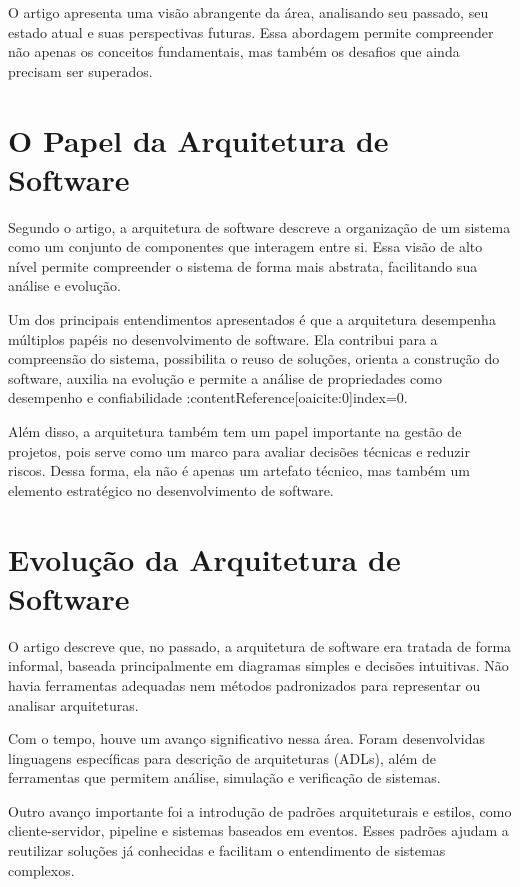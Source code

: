 \documentclass[conference]{IEEEtran}
\begin{document}
O artigo apresenta uma visão abrangente da área, analisando seu passado, seu estado atual e suas perspectivas futuras. Essa abordagem permite compreender não apenas os conceitos fundamentais, mas também os desafios que ainda precisam ser superados.

\section{O Papel da Arquitetura de Software}

Segundo o artigo, a arquitetura de software descreve a organização de um sistema como um conjunto de componentes que interagem entre si. Essa visão de alto nível permite compreender o sistema de forma mais abstrata, facilitando sua análise e evolução.

Um dos principais entendimentos apresentados é que a arquitetura desempenha múltiplos papéis no desenvolvimento de software. Ela contribui para a compreensão do sistema, possibilita o reuso de soluções, orienta a construção do software, auxilia na evolução e permite a análise de propriedades como desempenho e confiabilidade :contentReference[oaicite:0]{index=0}.

Além disso, a arquitetura também tem um papel importante na gestão de projetos, pois serve como um marco para avaliar decisões técnicas e reduzir riscos. Dessa forma, ela não é apenas um artefato técnico, mas também um elemento estratégico no desenvolvimento de software.

\section{Evolução da Arquitetura de Software}

O artigo descreve que, no passado, a arquitetura de software era tratada de forma informal, baseada principalmente em diagramas simples e decisões intuitivas. Não havia ferramentas adequadas nem métodos padronizados para representar ou analisar arquiteturas.

Com o tempo, houve um avanço significativo nessa área. Foram desenvolvidas linguagens específicas para descrição de arquiteturas (ADLs), além de ferramentas que permitem análise, simulação e verificação de sistemas.

Outro avanço importante foi a introdução de padrões arquiteturais e estilos, como cliente-servidor, pipeline e sistemas baseados em eventos. Esses padrões ajudam a reutilizar soluções já conhecidas e facilitam o entendimento de sistemas complexos.
\end{document}
